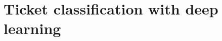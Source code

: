 \documentclass{UoYCSproject}
\begin{document}
%
%


    \section{Ticket classification with deep learning}
    \label{sec:estimation-with-deep-learning}
\end{document}
